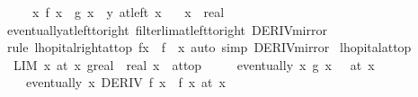 \begin{isabellebody}
\ \ \ \ {\isacharparenleft}{\kern0pt}{\isacharparenleft}{\kern0pt}{\isasymlambda}\ x{\isachardot}{\kern0pt}\ f\ x\ {\isacharslash}{\kern0pt}\ g\ x{\isacharparenright}{\kern0pt}\ {\isasymlonglongrightarrow}\ y{\isacharparenright}{\kern0pt}\ {\isacharparenleft}{\kern0pt}at{\isacharunderscore}{\kern0pt}left\ x{\isacharparenright}{\kern0pt}{\isachardoublequoteclose}\isanewline
\ \ \ x\ {\isacharcolon}{\kern0pt}{\isacharcolon}{\kern0pt}\ real\isanewline
%
\isadelimproof
\ \ %
\endisadelimproof
%
\isatagproof
{}\isamarkupfalse%
\ eventually{\isacharunderscore}{\kern0pt}at{\isacharunderscore}{\kern0pt}left{\isacharunderscore}{\kern0pt}to{\isacharunderscore}{\kern0pt}right\ filterlim{\isacharunderscore}{\kern0pt}at{\isacharunderscore}{\kern0pt}left{\isacharunderscore}{\kern0pt}to{\isacharunderscore}{\kern0pt}right\ DERIV{\isacharunderscore}{\kern0pt}mirror\isanewline
\ \ \isamarkupfalse%
\ {\isacharparenleft}{\kern0pt}rule\ lhopital{\isacharunderscore}{\kern0pt}right{\isacharunderscore}{\kern0pt}at{\isacharunderscore}{\kern0pt}top{\isacharbrackleft}{\kern0pt}\ f{\isacharprime}{\kern0pt}{\isacharequal}{\kern0pt}{\isachardoublequoteopen}{\isasymlambda}x{\isachardot}{\kern0pt}\ {\isacharminus}{\kern0pt}\ f{\isacharprime}{\kern0pt}\ {\isacharparenleft}{\kern0pt}{\isacharminus}{\kern0pt}\ x{\isacharparenright}{\kern0pt}{\isachardoublequoteclose}{\isacharbrackright}{\kern0pt}{\isacharparenright}{\kern0pt}\ {\isacharparenleft}{\kern0pt}auto\ simp{\isacharcolon}{\kern0pt}\ DERIV{\isacharunderscore}{\kern0pt}mirror{\isacharparenright}{\kern0pt}%
\endisatagproof
{\isafoldproof}%
%
\isadelimproof
\isanewline
%
\endisadelimproof
\isanewline
{}\isamarkupfalse%
\ lhopital{\isacharunderscore}{\kern0pt}at{\isacharunderscore}{\kern0pt}top{\isacharcolon}{\kern0pt}\isanewline
\ \ {\isachardoublequoteopen}LIM\ x\ at\ x{\isachardot}{\kern0pt}\ {\isacharparenleft}{\kern0pt}g{\isacharcolon}{\kern0pt}{\isacharcolon}{\kern0pt}real\ {\isasymRightarrow}\ real{\isacharparenright}{\kern0pt}\ x\ {\isacharcolon}{\kern0pt}{\isachargreater}{\kern0pt}\ at{\isacharunderscore}{\kern0pt}top\ {\isasymLongrightarrow}\isanewline
\ \ \ \ eventually\ {\isacharparenleft}{\kern0pt}{\isasymlambda}x{\isachardot}{\kern0pt}\ g{\isacharprime}{\kern0pt}\ x\ {\isasymnoteq}\ {}{\isacharparenright}{\kern0pt}\ {\isacharparenleft}{\kern0pt}at\ x{\isacharparenright}{\kern0pt}\ {\isasymLongrightarrow}\isanewline
\ \ \ \ eventually\ {\isacharparenleft}{\kern0pt}{\isasymlambda}x{\isachardot}{\kern0pt}\ DERIV\ f\ x\ {\isacharcolon}{\kern0pt}{\isachargreater}{\kern0pt}\ f{\isacharprime}{\kern0pt}\ x{\isacharparenright}{\kern0pt}\ {\isacharparenleft}{\kern0pt}at\ x{\isacharparenright}{\kern0pt}\ {\isasymLongrightarrow}\isanewline

\end{isabellebody}
